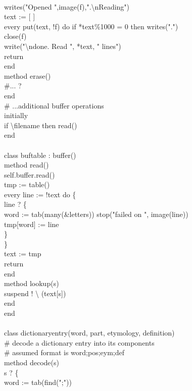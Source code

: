 {\ \\
\>\>writes("Opened ",image(f),".{\textbackslash}nReading") \\
\>\>text := [ ] \\
\>\>every put(text, !f) do if *text\%1000 = 0 then writes(".") \\
\>\>close(f) \\
\>\>write("{\textbackslash}ndone.  Read ", *text, " lines") \\
\>\>return \\
\>end \\
\>method erase() \\
\>\>\#... ? \\
\>end \\
\>\# ...additional buffer operations \\
initially \\
\>if {\textbackslash}filename then read() \\
end \\
\ \\
class buftable : buffer() \\
\>method read() \\
\>\>self.buffer.read() \\
\>\>tmp := table() \\
\>\>every line := !text do \{ \\
\>\>\>line ? \{ \\
\>\>\>\>word := tab(many(\&letters)) {\textbar} stop("failed on ", image(line)) \\
\>\>\>\>tmp[word] := line \\
\>\>\>\>\} \\
\>\>\>\} \\
\>\>text := tmp \\
\>\>return \\
\>end \\
\>method lookup(s) \\
\>\>suspend ! {\textbackslash} (text[s]) \\
\>end \\
end \\
\ \\
class dictionaryentry(word, part, etymology, definition) \\
\>\# decode a dictionary entry into its components \\
\>\# assumed format is word;pos;eym;def \\
\>method decode(s) \\
\>\>s ? \{ \\
\>\>\>word := tab(find(";")) \\
}
